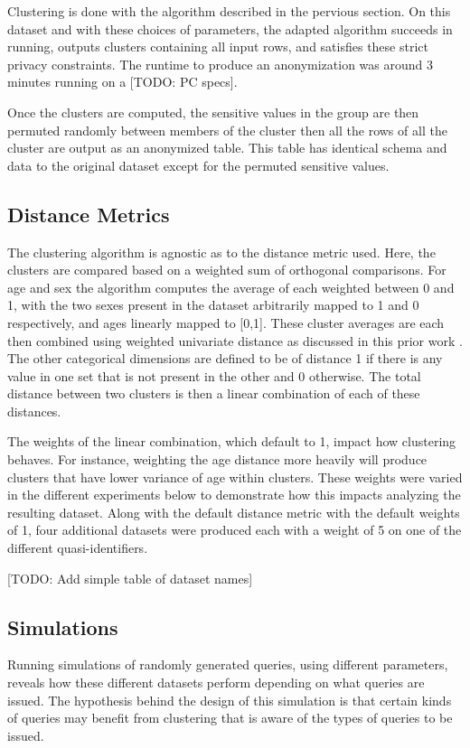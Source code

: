 Clustering is done with the algorithm described in the pervious section. On this dataset and with these choices of parameters, the adapted algorithm succeeds in running, outputs clusters containing all input rows, and satisfies these strict privacy constraints. The runtime to produce an anonymization was around 3 minutes running on a [TODO: PC specs].


Once the clusters are computed, the sensitive values in the group are then permuted randomly between members of the cluster then all the rows of all the cluster are output as an anonymized table. This table has identical schema and data to the original dataset except for the permuted sensitive values.

\subsection{Distance Metrics}
The clustering algorithm is agnostic as to the distance metric used. Here, the clusters are compared based on a weighted sum of orthogonal comparisons. For age and sex the algorithm computes the average of each weighted between 0 and 1, with the two sexes present in the dataset arbitrarily mapped to 1 and 0 respectively, and ages linearly mapped to [0,1]. These cluster averages are each then combined using weighted univariate distance as discussed in this prior work \cite{domingoPracticalCluster}. The other categorical dimensions are defined to be of distance 1 if there is any value in one set that is not present in the other and 0 otherwise. The total distance between two clusters is then a linear combination of each of these distances.

The weights of the linear combination, which default to 1, impact how clustering behaves. For instance, weighting the age distance more heavily will produce clusters that have lower variance of age within clusters. These weights were varied in the different experiments below to demonstrate how this impacts analyzing the resulting dataset. Along with the default distance metric with the default weights of 1, four additional datasets were produced each with a weight of 5 on one of the different quasi-identifiers.

[TODO: Add simple table of dataset names]

\subsection{Simulations}
Running simulations of randomly generated queries, using different parameters, reveals how these different datasets perform depending on what queries are issued. The hypothesis behind the design of this simulation is that certain kinds of queries may benefit from clustering that is aware of the types of queries to be issued.

